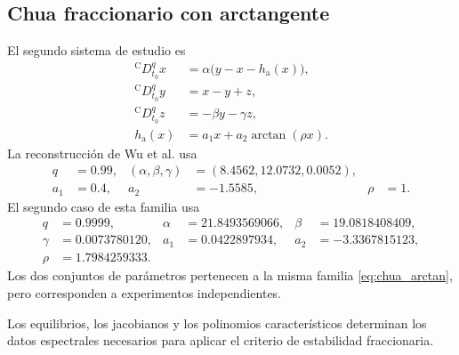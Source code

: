 \subsection{Chua fraccionario con arctangente}

El segundo sistema de estudio es
\begin{equation}
\begin{aligned}
 {}^{\mathrm C}D_{t_0}^{q}x
 &=\alpha\bigl(y-x-h_{\mathrm a}(x)\bigr),\\
 {}^{\mathrm C}D_{t_0}^{q}y
 &=x-y+z,\\
 {}^{\mathrm C}D_{t_0}^{q}z
 &=-\beta y-\gamma z,\\
 h_{\mathrm a}(x)&=a_1x+a_2\arctan(\rho x).
\end{aligned}
\label{eq:chua_arctan}
\end{equation}
La reconstrucción de Wu et al. usa
\begin{equation}
\begin{aligned}
q&=0.99,&
(\alpha,\beta,\gamma)&=(8.4562,12.0732,0.0052),\\
a_1&=0.4,&a_2&=-1.5585,&\rho&=1.
\end{aligned}
\label{eq:parametros_wu}
\end{equation}
El segundo caso de esta familia usa
\begin{equation}
\begin{aligned}
q&=0.9999,&
\alpha&=21.8493569066,&
\beta&=19.0818408409,\\
\gamma&=0.0073780120,&
a_1&=0.0422897934,&
a_2&=-3.3367815123,\\
\rho&=1.7984259333.
\end{aligned}
\label{eq:parametros_c590}
\end{equation}
Los dos conjuntos de parámetros pertenecen a la misma familia
\cref{eq:chua_arctan}, pero corresponden a experimentos independientes.

Los equilibrios, los jacobianos y los polinomios característicos determinan
los datos espectrales necesarios para aplicar el criterio de estabilidad
fraccionaria.

\begingroup
\def\HAFOderivationpart{3}

\endgroup
\begingroup
\def\HAFOderivationpart{4}

\endgroup
\begingroup
\def\HAFOderivationpart{5}

\endgroup
\fi

\ifdefined\HAFOModelsOnly\else
\begingroup
\ifdefined\HAFOFractionalBlockSelect\else
  \def\HAFOFractionalBlockOperators{1}
  \def\HAFOFractionalBlockStability{1}
\fi

